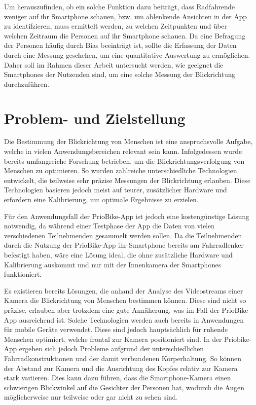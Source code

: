Um herauszufinden, ob ein solche Funktion dazu beiträgt, dass Radfahrende weniger auf ihr Smartphone schauen, bzw. um ablenkende Ansichten in der App zu identifzieren, muss ermittelt werden, zu welchen Zeitpunkten und über welchen Zeitraum die Personen auf ihr Smartphone schauen. Da eine Befragung der Personen häufig durch Bias beeinträgt ist, sollte die Erfassung der Daten durch eine Messung geschehen, um eine quantitative Auswertung zu ermöglichen. Daher soll im Rahmen dieser Arbeit untersucht werden, wie geeignet die Smartphones der Nutzenden sind, um eine solche Messung der Blickrichtung durchzuführen.

\section{Problem- und Zielstellung}\label{sec:introduction:goal}

Die Bestimmung der Blickrichtung von Menschen ist eine anspruchsvolle Aufgabe, welche in vielen Anwendungsbereichen relevant sein kann. Infolgedessen wurde bereits umfangreiche Forschung betrieben, um die Blickrichtungsverfolgung von Menschen zu optimieren. So wurden zahlreiche unterschiedliche Technologien entwickelt, die teilweise sehr präzise Messungen der Blickrichtung erlauben. Diese Technologien basieren jedoch meist auf teurer, zusätzlicher Hardware und erfordern eine Kalibrierung, um optimale Ergebnisse zu erzielen.

Für den Anwendungsfall der PrioBike-App ist jedoch eine kostengünstige Lösung notwendig, da während einer Testphase der App die Daten von vielen verschiedenen Teilnehmenden gesammelt werden sollen. Da die Teilnehmenden durch die Nutzung der PrioBike-App ihr Smartphone bereits am Fahrradlenker befestigt haben, wäre eine Lösung ideal, die ohne zusätzliche Hardware und Kalibrierung auskommt und nur mit der Innenkamera der Smartphones funktioniert.

Es existieren bereits Lösungen, die anhand der Analyse des Videostreams einer Kamera die Blickrichtung von Menschen bestimmen können. Diese sind nicht so präzise, erlauben aber trotzdem eine gute Annäherung, was im Fall der PrioBike-App ausreichend ist. Solche Technologien werden auch bereits in Anwendungen für mobile Geräte verwendet. Diese sind jedoch hauptsächlich für ruhende Menschen optimiert, welche frontal zur Kamera positioniert sind. In der Priobike-App ergeben sich jedoch Probleme aufgrund der unterschiedlichen Fahrradkonstruktionen und der damit verbundenen Körperhaltung. So können der Abstand zur Kamera und die Ausrichtung des Kopfes relativ zur Kamera stark variieren. Dies kann dazu führen, dass die Smartphone-Kamera einen schwierigen Blickwinkel auf die Gesichter der Personen hat, wodurch die Augen möglicherweise nur teilweise oder gar nicht zu sehen sind.

